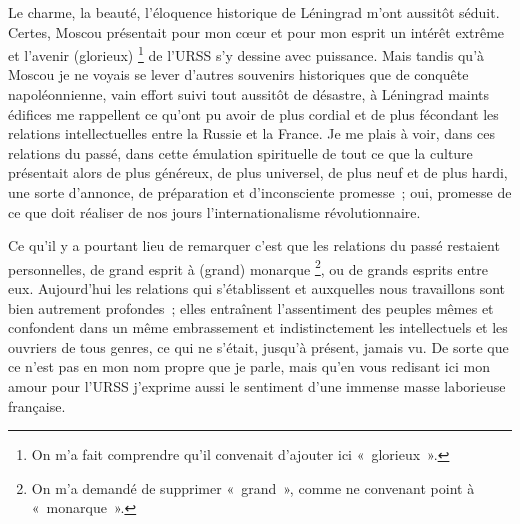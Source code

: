 \documentclass[french,twoside]{book} %
\begin{document}
\noindent Le charme, la beauté, l’éloquence historique de Léningrad m’ont aussitôt séduit. Certes, Moscou présentait pour mon cœur et pour mon esprit un intérêt extrême et l’avenir (glorieux) \footnote{On m’a fait comprendre qu’il convenait d’ajouter ici « glorieux ».} de l’URSS s’y dessine avec puissance. Mais tandis qu’à Moscou je ne voyais se lever d’autres souvenirs historiques que de conquête napoléonnienne, vain effort suivi tout aussitôt de désastre, à Léningrad maints édifices me rappellent ce qu’ont pu avoir de plus cordial et de plus fécondant les relations intellectuelles entre la Russie et la France. Je me plais à voir, dans ces relations du passé, dans cette émulation spirituelle de tout ce que la culture présentait alors de plus généreux, de plus universel, de plus neuf et de plus hardi, une sorte d’annonce, de préparation et d’inconsciente promesse ; oui, promesse de ce que doit réaliser de nos jours l’internationalisme révolutionnaire.\par
Ce qu’il y a pourtant lieu de remarquer c’est que les relations du passé restaient personnelles, de grand esprit à (grand) monarque \footnote{On m’a demandé de supprimer « grand », comme ne convenant point à « monarque ».}, ou de grands esprits entre eux. Aujourd’hui les relations qui s’établissent et auxquelles nous travaillons sont bien autrement profondes ; elles entraînent l’assentiment des peuples mêmes et confondent dans un même embrassement et indistinctement les intellectuels et les ouvriers de tous genres, ce qui ne s’était, jusqu’à présent, jamais vu. De sorte que ce n’est pas en mon nom propre que je parle, mais qu’en vous redisant ici mon amour pour l’URSS j’exprime aussi le sentiment d’une immense masse laborieuse française.\par
\end{document}
